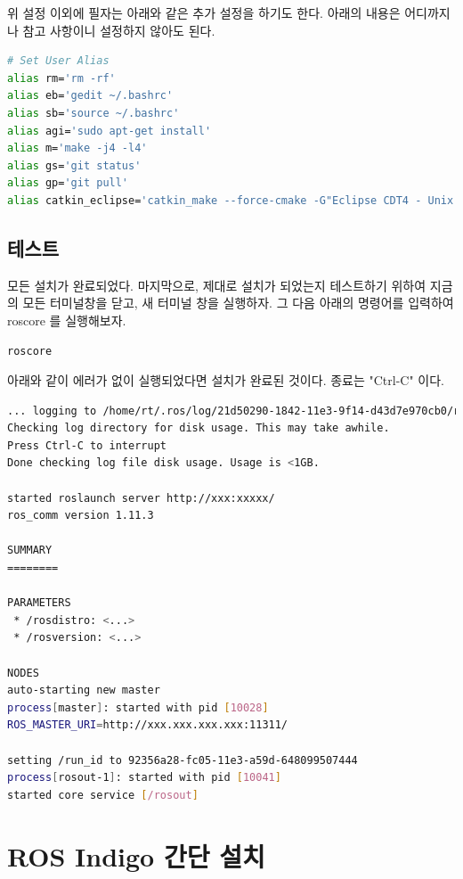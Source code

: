 위 설정 이외에 필자는 아래와 같은 추가 설정을 하기도 한다. 아래의 내용은 어디까지나 참고 사항이니 설정하지 않아도 된다.

\begin{lstlisting}[language=bash]
# Set User Alias
alias rm='rm -rf' 
alias eb='gedit ~/.bashrc' 
alias sb='source ~/.bashrc'
alias agi='sudo apt-get install'  
alias m='make -j4 -l4'  
alias gs='git status'  
alias gp='git pull'
alias catkin_eclipse='catkin_make --force-cmake -G"Eclipse CDT4 - Unix Makefiles"'
\end{lstlisting}

\subsection{테스트}

모든 설치가 완료되었다. 마지막으로, 제대로 설치가 되었는지 테스트하기 위하여 지금의 모든 터미널창을 닫고, 새 터미널 창을 실행하자. 그 다음 아래의 명령어를 입력하여 roscore 를 실행해보자.

\begin{lstlisting}[language=bash]
roscore
\end{lstlisting}

\noindent
아래와 같이 에러가 없이 실행되었다면 설치가 완료된 것이다. 종료는 "Ctrl-C" 이다.

\begin{lstlisting}[language=bash]
... logging to /home/rt/.ros/log/21d50290-1842-11e3-9f14-d43d7e970cb0/roslaunch-rt-5461.log
Checking log directory for disk usage. This may take awhile.
Press Ctrl-C to interrupt
Done checking log file disk usage. Usage is <1GB.

started roslaunch server http://xxx:xxxxx/
ros_comm version 1.11.3

SUMMARY
========

PARAMETERS
 * /rosdistro: <...>
 * /rosversion: <...>

NODES
auto-starting new master
process[master]: started with pid [10028]
ROS_MASTER_URI=http://xxx.xxx.xxx.xxx:11311/

setting /run_id to 92356a28-fc05-11e3-a59d-648099507444
process[rosout-1]: started with pid [10041]
started core service [/rosout]
\end{lstlisting}

\section{ROS Indigo 간단 설치}
\label{sec:SimpleInstallation}

